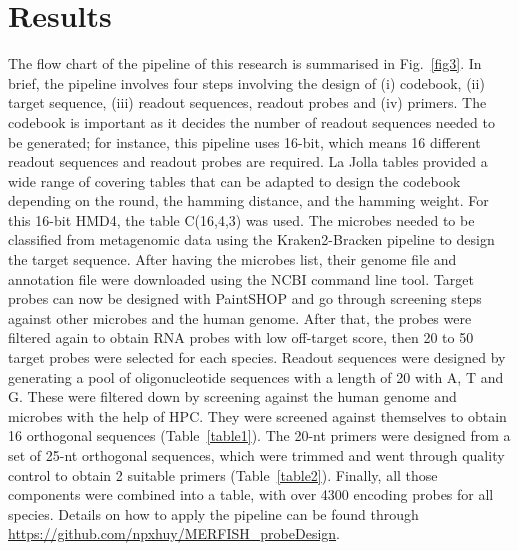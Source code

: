\documentclass[10pt,letterpaper]{article}
\begin{document}
\section*{Results}
The flow chart of the pipeline of this research is summarised in Fig.~\ref{fig3}. In brief, the pipeline involves four steps involving the design of (i) codebook, (ii) target sequence, (iii) readout sequences, readout probes and (iv) primers. The codebook is important as it decides the number of readout sequences needed to be generated; for instance, this pipeline uses 16-bit, which means 16 different readout sequences and readout probes are required. La Jolla tables provided a wide range of covering tables that can be adapted to design the codebook depending on the round, the hamming distance, and the hamming weight. For this 16-bit HMD4, the table C(16,4,3) was used. The microbes needed to be classified from metagenomic data using the Kraken2-Bracken pipeline to design the target sequence. After having the microbes list, their genome file and annotation file were downloaded using the NCBI command line tool. Target probes can now be designed with PaintSHOP and go through screening steps against other microbes and the human genome. After that, the probes were filtered again to obtain RNA probes with low off-target score, then 20 to 50 target probes were selected for each species. Readout sequences were designed by generating a pool of oligonucleotide sequences with a length of 20 with A, T and G. These were filtered down by screening against the human genome and microbes with the help of HPC. They were screened against themselves to obtain 16 orthogonal sequences (Table~\ref{table1}). The 20-nt primers were designed from a set of 25-nt orthogonal sequences, which were trimmed and went through quality control to obtain 2 suitable primers (Table~\ref{table2}). Finally, all those components were combined into a table, with over 4300 encoding probes for all species. Details on how to apply the pipeline can be found through \url{https://github.com/npxhuy/MERFISH_probeDesign}.
\end{document}

